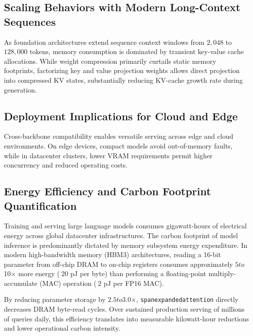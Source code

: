 \subsection{Scaling Behaviors with Modern Long-Context Sequences}
As foundation architectures extend sequence context windows from $2{,}048$ to $128{,}000$ tokens, memory consumption is dominated by transient key-value cache allocations. While weight compression primarily curtails static memory footprints, factorizing key and value projection weights allows direct projection into compressed KV states, substantially reducing KV-cache growth rate during generation.

\subsection{Deployment Implications for Cloud and Edge}
Cross-backbone compatibility enables versatile serving across edge and cloud environments. On edge devices, compact models avoid out-of-memory faults, while in datacenter clusters, lower VRAM requirements permit higher concurrency and reduced operating costs.

\subsection{Energy Efficiency and Carbon Footprint Quantification}
Training and serving large language models consumes gigawatt-hours of electrical energy across global datacenter infrastructures. The carbon footprint of model inference is predominantly dictated by memory subsystem energy expenditure. In modern high-bandwidth memory (HBM3) architectures, reading a 16-bit parameter from off-chip DRAM to on-chip registers consumes approximately $5$\times$ to $10$\times$ more energy ($~20$ pJ per byte) than performing a floating-point multiply-accumulate (MAC) operation ($~2$ pJ per FP16 MAC).

By reducing parameter storage by $2.5$\times$ to $3.0$\times$, \texttt{spanexpandedattention} directly decreases DRAM byte-read cycles. Over sustained production serving of millions of queries daily, this efficiency translates into measurable kilowatt-hour reductions and lower operational carbon intensity.
